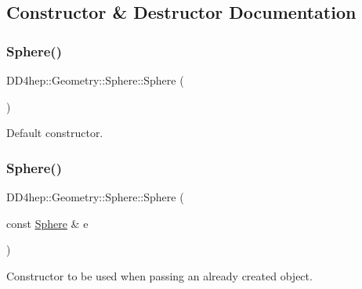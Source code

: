 \subsection{Constructor \& Destructor Documentation}
\hypertarget{class_d_d4hep_1_1_geometry_1_1_sphere_ad2013cdd3ef048e5a33aa6cbb56216c6}{}\label{class_d_d4hep_1_1_geometry_1_1_sphere_ad2013cdd3ef048e5a33aa6cbb56216c6} 
\subsubsection{\texorpdfstring{Sphere()}{Sphere()}\hspace{0.1cm}{\footnotesize\ttfamily [1/5]}}
{\footnotesize\ttfamily D\+D4hep\+::\+Geometry\+::\+Sphere\+::\+Sphere (\begin{DoxyParamCaption}{ }\end{DoxyParamCaption})\hspace{0.3cm}{\ttfamily [default]}}



Default constructor. 

\hypertarget{class_d_d4hep_1_1_geometry_1_1_sphere_a7b708443e8b15948c884f6cbc07bddc0}{}\label{class_d_d4hep_1_1_geometry_1_1_sphere_a7b708443e8b15948c884f6cbc07bddc0} 
\subsubsection{\texorpdfstring{Sphere()}{Sphere()}\hspace{0.1cm}{\footnotesize\ttfamily [2/5]}}
{\footnotesize\ttfamily D\+D4hep\+::\+Geometry\+::\+Sphere\+::\+Sphere (\begin{DoxyParamCaption}\item[{const \hyperlink{class_d_d4hep_1_1_geometry_1_1_sphere}{Sphere} \&}]{e }\end{DoxyParamCaption})\hspace{0.3cm}{\ttfamily [default]}}



Constructor to be used when passing an already created object. 

\hypertarget{class_d_d4hep_1_1_geometry_1_1_sphere_a5833902d7e39b4d500fdba123b4f47d3}{}\label{class_d_d4hep_1_1_geometry_1_1_sphere_a5833902d7e39b4d500fdba123b4f47d3} 
